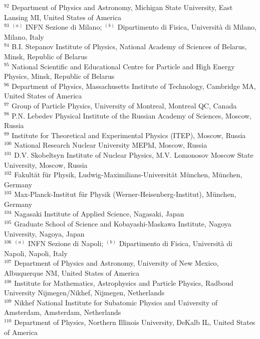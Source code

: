 \begin{flushleft}
$^{92}$ Department of Physics and Astronomy, Michigan State University, East Lansing MI, United States of America\\
$^{93}$ $^{(a)}$ INFN Sezione di Milano; $^{(b)}$ Dipartimento di Fisica, Universit{\`a} di Milano, Milano, Italy\\
$^{94}$ B.I. Stepanov Institute of Physics, National Academy of Sciences of Belarus, Minsk, Republic of Belarus\\
$^{95}$ National Scientific and Educational Centre for Particle and High Energy Physics, Minsk, Republic of Belarus\\
$^{96}$ Department of Physics, Massachusetts Institute of Technology, Cambridge MA, United States of America\\
$^{97}$ Group of Particle Physics, University of Montreal, Montreal QC, Canada\\
$^{98}$ P.N. Lebedev Physical Institute of the Russian Academy of Sciences, Moscow, Russia\\
$^{99}$ Institute for Theoretical and Experimental Physics (ITEP), Moscow, Russia\\
$^{100}$ National Research Nuclear University MEPhI, Moscow, Russia\\
$^{101}$ D.V. Skobeltsyn Institute of Nuclear Physics, M.V. Lomonosov Moscow State University, Moscow, Russia\\
$^{102}$ Fakult{\"a}t f{\"u}r Physik, Ludwig-Maximilians-Universit{\"a}t M{\"u}nchen, M{\"u}nchen, Germany\\
$^{103}$ Max-Planck-Institut f{\"u}r Physik (Werner-Heisenberg-Institut), M{\"u}nchen, Germany\\
$^{104}$ Nagasaki Institute of Applied Science, Nagasaki, Japan\\
$^{105}$ Graduate School of Science and Kobayashi-Maskawa Institute, Nagoya University, Nagoya, Japan\\
$^{106}$ $^{(a)}$ INFN Sezione di Napoli; $^{(b)}$ Dipartimento di Fisica, Universit{\`a} di Napoli, Napoli, Italy\\
$^{107}$ Department of Physics and Astronomy, University of New Mexico, Albuquerque NM, United States of America\\
$^{108}$ Institute for Mathematics, Astrophysics and Particle Physics, Radboud University Nijmegen/Nikhef, Nijmegen, Netherlands\\
$^{109}$ Nikhef National Institute for Subatomic Physics and University of Amsterdam, Amsterdam, Netherlands\\
$^{110}$ Department of Physics, Northern Illinois University, DeKalb IL, United States of America\\

\end{flushleft}
